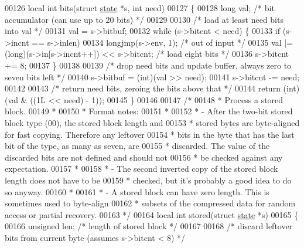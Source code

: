 \begin{DoxyCode}
00126 local \textcolor{keywordtype}{int} bits(\textcolor{keyword}{struct} \hyperlink{structstate}{state} *s, \textcolor{keywordtype}{int} need)
00127 \{
00128     \textcolor{keywordtype}{long} val;           \textcolor{comment}{/* bit accumulator (can use up to 20 bits) */}
00129 
00130     \textcolor{comment}{/* load at least need bits into val */}
00131     val = s->bitbuf;
00132     \textcolor{keywordflow}{while} (s->bitcnt < need) \{
00133         \textcolor{keywordflow}{if} (s->incnt == s->inlen)
00134             longjmp(s->env, 1);         \textcolor{comment}{/* out of input */}
00135         val |= (long)(s->in[s->incnt++]) << s->bitcnt;  \textcolor{comment}{/* load eight bits */}
00136         s->bitcnt += 8;
00137     \}
00138 
00139     \textcolor{comment}{/* drop need bits and update buffer, always zero to seven bits left */}
00140     s->bitbuf = (int)(val >> need);
00141     s->bitcnt -= need;
00142 
00143     \textcolor{comment}{/* return need bits, zeroing the bits above that */}
00144     \textcolor{keywordflow}{return} (\textcolor{keywordtype}{int})(val & ((1L << need) - 1));
00145 \}
00146 
00147 \textcolor{comment}{/*}
00148 \textcolor{comment}{ * Process a stored block.}
00149 \textcolor{comment}{ *}
00150 \textcolor{comment}{ * Format notes:}
00151 \textcolor{comment}{ *}
00152 \textcolor{comment}{ * - After the two-bit stored block type (00), the stored block length and}
00153 \textcolor{comment}{ *   stored bytes are byte-aligned for fast copying.  Therefore any leftover}
00154 \textcolor{comment}{ *   bits in the byte that has the last bit of the type, as many as seven, are}
00155 \textcolor{comment}{ *   discarded.  The value of the discarded bits are not defined and should not}
00156 \textcolor{comment}{ *   be checked against any expectation.}
00157 \textcolor{comment}{ *}
00158 \textcolor{comment}{ * - The second inverted copy of the stored block length does not have to be}
00159 \textcolor{comment}{ *   checked, but it's probably a good idea to do so anyway.}
00160 \textcolor{comment}{ *}
00161 \textcolor{comment}{ * - A stored block can have zero length.  This is sometimes used to byte-align}
00162 \textcolor{comment}{ *   subsets of the compressed data for random access or partial recovery.}
00163 \textcolor{comment}{ */}
00164 local \textcolor{keywordtype}{int} stored(\textcolor{keyword}{struct} \hyperlink{structstate}{state} *s)
00165 \{
00166     \textcolor{keywordtype}{unsigned} len;       \textcolor{comment}{/* length of stored block */}
00167 
00168     \textcolor{comment}{/* discard leftover bits from current byte (assumes s->bitcnt < 8) */}

\end{DoxyCode}
